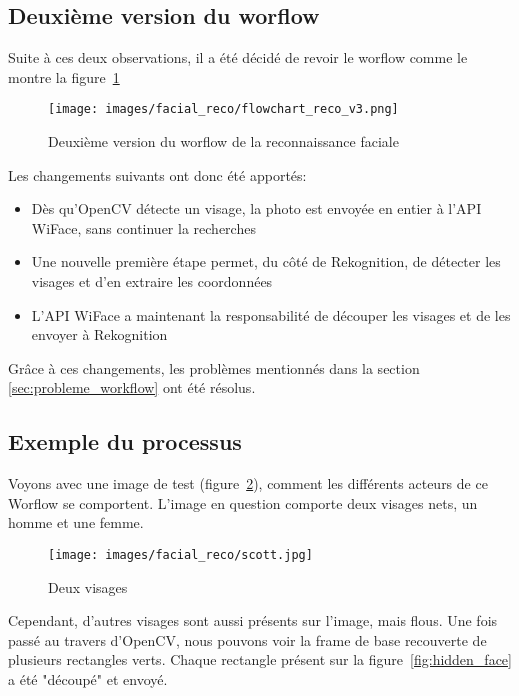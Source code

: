 \subsection{Deuxième version du worflow}
Suite à ces deux observations, il a été décidé de revoir le worflow comme le montre la figure~\ref{fig:worflow-reco2}

\clearpage
\newpage

\thispagestyle{empty}
\begin{landscape}
    \centering
\thispagestyle{empty}
\begin{figure}%
     \texttt{[image: images/facial\_reco/flowchart\_reco\_v3.png]}
     \caption{Deuxième version du worflow de la reconnaissance faciale}
     \label{fig:worflow-reco2}
\end{figure}
\end{landscape}

Les changements suivants ont donc été apportés:
\begin{itemize}
    \item Dès qu'OpenCV détecte un visage, la photo est envoyée en entier à l'API WiFace, sans continuer la recherches
    \item Une nouvelle première étape permet, du côté de Rekognition, de détecter les visages et d'en extraire les coordonnées
    \item L'API WiFace a maintenant la responsabilité de découper les visages et de les envoyer à Rekognition
\end{itemize}

Grâce à ces changements, les problèmes mentionnés dans la section \ref{sec:probleme_workflow} ont été résolus.
\subsection{Exemple du processus}
Voyons avec une image de test (figure~\ref{fig:scott}), comment les différents acteurs de ce Worflow se comportent.
L'image en question comporte deux visages nets, un homme et une femme.

\begin{figure}[H]
	\centering
	\texttt{[image: images/facial\_reco/scott.jpg]}
    \caption{Deux visages}
	\label{fig:scott}
\end{figure}

Cependant, d'autres visages sont aussi présents sur l'image, mais flous. 
Une fois passé au travers d'OpenCV, nous pouvons voir la frame de base recouverte de plusieurs rectangles verts.
Chaque rectangle présent sur la figure~\ref{fig:hidden_face} a été "découpé" et envoyé.

